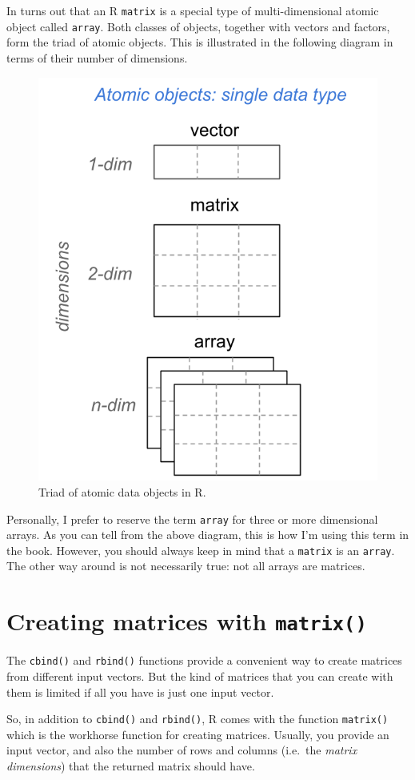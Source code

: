 \documentclass[
]{book}
\begin{document}
In turns out that an R \texttt{matrix} is a special type of multi-dimensional atomic
object called \texttt{array}. Both classes of objects, together with vectors and
factors, form the triad of atomic objects. This is illustrated in the following
diagram in terms of their number of dimensions.

\begin{figure}

{\centering \includegraphics[width=0.5\linewidth]{images/objects/obj-atomics} 

}

\caption{Triad of atomic data objects in R.}\label{fig:unnamed-chunk-101}
\end{figure}

Personally, I prefer to reserve the term \texttt{array} for three or more dimensional
arrays. As you can tell from the above diagram, this is how I'm using this
term in the book. However, you should always keep in mind that a \texttt{matrix} is an
\texttt{array}. The other way around is not necessarily true: not all arrays are
matrices.

\hypertarget{creating-matrices-with-matrix}{%
\section{\texorpdfstring{Creating matrices with \texttt{matrix()}}{Creating matrices with matrix()}}\label{creating-matrices-with-matrix}}

The \texttt{cbind()} and \texttt{rbind()} functions provide a convenient way to create
matrices from different input vectors. But the kind of matrices that you can
create with them is limited if all you have is just one input vector.

So, in addition to \texttt{cbind()} and \texttt{rbind()}, R comes with the function \texttt{matrix()}
which is the workhorse function for creating matrices. Usually, you provide
an input vector, and also the number of rows and columns (i.e.~the
\emph{matrix dimensions}) that the returned matrix should have.
\end{document}
